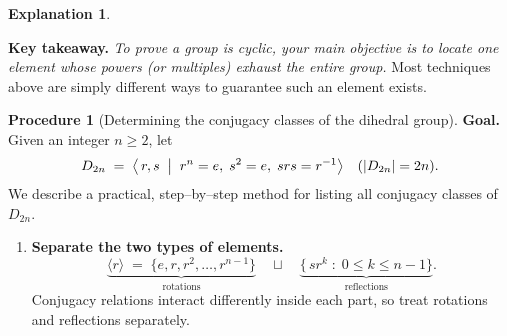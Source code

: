 \documentclass[12pt]{article}
\theoremstyle{definition} %
\newtheorem{procedure}{Procedure}
\newtheorem{explanation}{Explanation}
\theoremstyle{plain} %
\begin{document}
\begin{explanation}
\begin{enumerate}[label=\textbf{(\arabic*)},leftmargin=2.2em]
    \end{enumerate}
    
    \medskip
    \noindent\textbf{Key takeaway.}
    \emph{To prove a group is cyclic, your main objective is to locate one
    element whose powers (or multiples) exhaust the entire group.}
    Most techniques above are simply different ways to guarantee such an
    element exists.
    \end{explanation}
    \begin{procedure}[Determining the conjugacy classes of the dihedral group]
      \textbf{Goal.}
      Given an integer \(n\ge 2\), let
      \[
         D_{2n}
            \;=\;
            \bigl\langle\,r,s
            \;\bigm|\;
              r^{n}=e,\;
              s^{2}=e,\;
              srs=r^{-1}
            \bigr\rangle
            \quad
            (\lvert D_{2n}\rvert = 2n).
      \]
      We describe a practical, step–by–step method for listing all conjugacy
      classes of \(D_{2n}\).
      
      \medskip
      \begin{enumerate}[label=\textbf{Step \arabic*.},leftmargin=2.8em]
      
      \item \textbf{Separate the two types of elements.}
            \[
               \underbrace{\langle r\rangle
                 \;=\;\{e,r,r^{2},\dots,r^{n-1}\}}_{\text{rotations}}
               \quad\sqcup\quad
               \underbrace{
                 \bigl\{\,s r^{k}\;:\;0\le k\le n-1\bigr\}
               }_{\text{reflections}}.
            \]
            Conjugacy relations interact differently inside each part, so
            treat rotations and reflections separately.
      

\end{enumerate}
\end{procedure}
\end{document}

